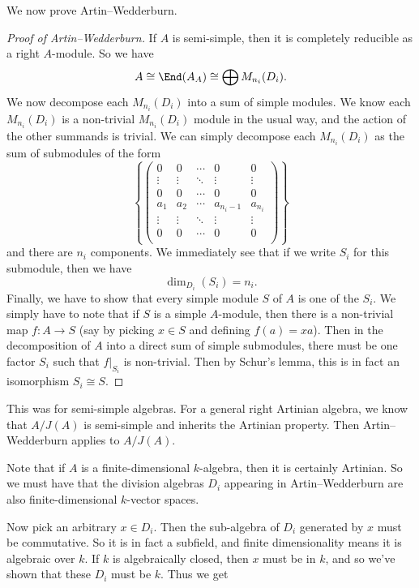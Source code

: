 \documentclass[a4paper]{article}
\begin{document}
We now prove Artin--Wedderburn.
\begin{proof}[Proof of Artin--Wedderburn]
  If $A$ is semi-simple, then it is completely reducible as a right $A$-module. So we have
  \[
    A \cong \End(A_A) \cong \bigoplus M_{n_i}(D_i).
  \]
  We now decompose each $M_{n_i}(D_i)$ into a sum of simple modules. We know each $M_{n_i}(D_i)$ is a non-trivial $M_{n_i}(D_i)$ module in the usual way, and the action of the other summands is trivial. We can simply decompose each $M_{n_i}(D_i)$ as the sum of submodules of the form
  \[
    \left\{
      \begin{pmatrix}
        0 & 0 & \cdots & 0 & 0\\
        \vdots & \vdots & \ddots & \vdots & \vdots\\
        0 & 0 & \cdots & 0 & 0\\
        a_1 & a_2 & \cdots & a_{n_i - 1} & a_{n_i}\\
        \vdots & \vdots & \ddots & \vdots & \vdots\\
        0 & 0 & \cdots & 0 & 0 \\
      \end{pmatrix}
    \right\}
  \]
  and there are $n_i$ components. We immediately see that if we write $S_i$ for this submodule, then we have
  \[
    \dim_{D_i}(S_i) = n_i.
  \]
  Finally, we have to show that every simple module $S$ of $A$ is one of the $S_i$. We simply have to note that if $S$ is a simple $A$-module, then there is a non-trivial map $f: A \to S$ (say by picking $x \in S$ and defining $f(a) = xa$). Then in the decomposition of $A$ into a direct sum of simple submodules, there must be one factor $S_i$ such that $f|_{S_i}$ is non-trivial. Then by Schur's lemma, this is in fact an isomorphism $S_i \cong S$.
\end{proof}

This was for semi-simple algebras. For a general right Artinian algebra, we know that $A/J(A)$ is semi-simple and inherits the Artinian property. Then Artin--Wedderburn applies to $A/J(A)$.

Note that if $A$ is a finite-dimensional $k$-algebra, then it is certainly Artinian. So we must have that the division algebras $D_i$ appearing in Artin--Wedderburn are also finite-dimensional $k$-vector spaces.

Now pick an arbitrary $x \in D_i$. Then the sub-algebra of $D_i$ generated by $x$ must be commutative. So it is in fact a subfield, and finite dimensionality means it is algebraic over $k$. If $k$ is algebraically closed, then $x$ must be in $k$, and so we've shown that these $D_i$ must be $k$. Thus we get
\end{document}
